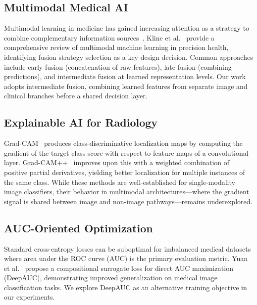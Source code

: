 \documentclass[conference]{IEEEtran}
\begin{document}
\subsection{Multimodal Medical AI}

Multimodal learning in medicine has gained increasing attention as a strategy to combine complementary information sources~\cite{acosta2022multimodal, lipkova2022multimodal}. Kline et al.~\cite{kline2022multimodal} provide a comprehensive review of multimodal machine learning in precision health, identifying fusion strategy selection as a key design decision. Common approaches include early fusion (concatenation of raw features), late fusion (combining predictions), and intermediate fusion at learned representation levels. Our work adopts intermediate fusion, combining learned features from separate image and clinical branches before a shared decision layer.

\subsection{Explainable AI for Radiology}

Grad-CAM~\cite{selvaraju2017gradcam} produces class-discriminative localization maps by computing the gradient of the target class score with respect to feature maps of a convolutional layer. Grad-CAM++~\cite{chattopadhay2018gradcampp} improves upon this with a weighted combination of positive partial derivatives, yielding better localization for multiple instances of the same class. While these methods are well-established for single-modality image classifiers, their behavior in multimodal architectures---where the gradient signal is shared between image and non-image pathways---remains underexplored.

\subsection{AUC-Oriented Optimization}

Standard cross-entropy losses can be suboptimal for imbalanced medical datasets where area under the ROC curve (AUC) is the primary evaluation metric. Yuan et al.~\cite{yuan2021deepauc} propose a compositional surrogate loss for direct AUC maximization (DeepAUC), demonstrating improved generalization on medical image classification tasks. We explore DeepAUC as an alternative training objective in our experiments.

\end{document}
